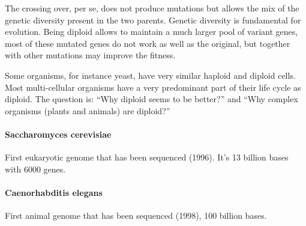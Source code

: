 The crossing over, per se, does not produce mutations but allows the mix of the
genetic diversity present in the two parents. Genetic diversity is fundamental
for evolution. Being diploid allows to maintain a much larger pool of variant
genes, most of these mutated genes do not work as well as the original, but
together with other mutations may improve the fitness.

Some organisms, for instance yeast, have very similar haploid and diploid
cells. Most multi-cellular organisms have a very predominant part of their life
cycle as diploid. The question is: ``Why diploid seems to be better?'' and ``Why
complex organisms (plants and animals) are diploid?''

\paragraph*{Saccharomyces cerevisiae}
First eukaryotic genome that has been sequenced (1996). It's 13 billion bases
with 6000 genes.

\paragraph*{Caenorhabditis elegans}
First animal genome that has been sequenced (1998), 100 billion bases.
